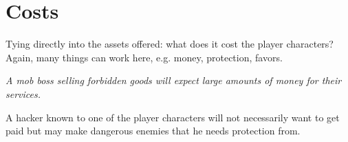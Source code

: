 \documentclass[12pt,a4paper,openany,usenames,dvipsnames]{book}
\begin{document}
	\section*{Costs}
	Tying directly into the assets offered: what does it cost the player characters? Again, many things can work here, e.g. money, protection, favors.
	\begin{exampleblock}
		\itshape A mob boss selling forbidden goods will expect large amounts of money for their services.\par
		A hacker known to one of the player characters will not necessarily want to get paid but may make dangerous enemies that he needs protection from.
	\end{exampleblock}
\end{document}
